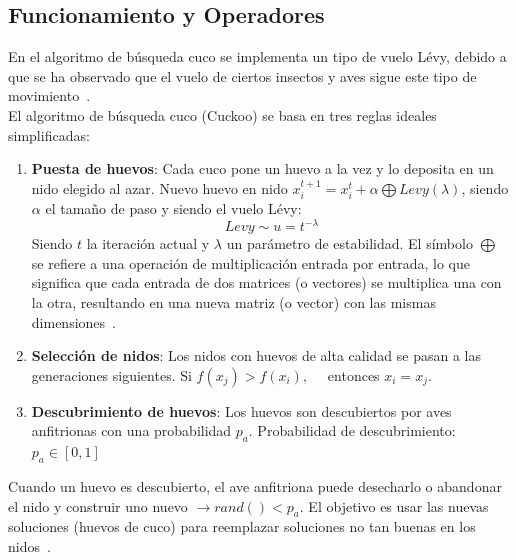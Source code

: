 \subsection{Funcionamiento y Operadores}
En el algoritmo de búsqueda cuco se implementa un tipo de vuelo Lévy, debido a que se ha observado que el vuelo de ciertos insectos y aves sigue este tipo de movimiento~\cite{yang_cuckoo_2010}.\\[6pt]
El algoritmo de búsqueda cuco (Cuckoo) se basa en tres reglas ideales simplificadas:

\begin{enumerate}
    \item \textbf{Puesta de huevos}: Cada cuco pone un huevo a la vez y lo deposita en un nido elegido al azar. Nuevo huevo en nido $x_i^{t+1}= x_i^t + \alpha \bigoplus Levy(\lambda)$, siendo $\alpha$ el tamaño de paso y siendo el vuelo Lévy:
          \begin{equation}
              Levy \sim u=t^{-\lambda}
          \end{equation}
          Siendo $t$ la iteración actual y $\lambda$ un parámetro de estabilidad. El símbolo $\bigoplus$ se refiere a una operación de multiplicación entrada por entrada, lo que significa que cada entrada de dos matrices (o vectores) se multiplica una con la otra, resultando en una nueva matriz (o vector) con las mismas dimensiones~\cite{yang_cuckoo_2010}.
    \item \textbf{Selección de nidos}: Los nidos con huevos de alta calidad se pasan a las generaciones siguientes. Si $f(x_j) > f(x_i), \quad$ entonces $x_i = x_j$.
    \item \textbf{Descubrimiento de huevos}: Los huevos son descubiertos por aves anfitrionas con una probabilidad $p_a$. Probabilidad de descubrimiento: $p_a \in [0, 1]$
\end{enumerate}

Cuando un huevo es descubierto, el ave anfitriona puede desecharlo o abandonar el nido y construir uno nuevo $\rightarrow rand() < p_a$. El objetivo es usar las nuevas soluciones (huevos de cuco) para reemplazar soluciones no tan buenas en los nidos~\cite{yang_cuckoo_2010}.

